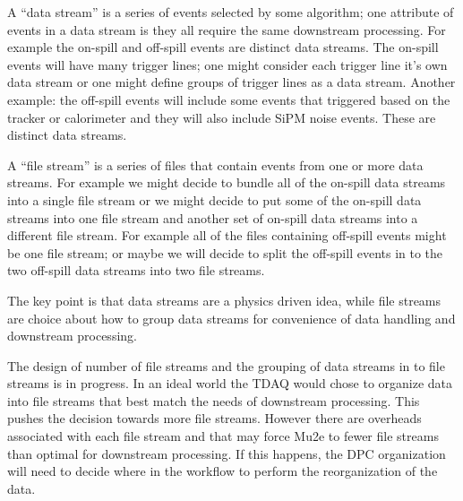 
A ``data stream'' is a series of events selected by some algorithm;
one attribute of events in a data stream is they all require the same downstream processing.
For example the on-spill and off-spill events are distinct data streams.
The on-spill events will have many trigger lines; one might consider each trigger
line it's own data stream or one might define groups of trigger lines as a data stream.
Another example: the off-spill events will include some events that triggered based on
the tracker or calorimeter and they will also include SiPM noise events.
These are distinct data streams.

A ``file stream'' is a series of files that contain events from one or more data streams.
For example we might decide to bundle all of the on-spill data streams into a single
file stream or we might decide to put some of the on-spill data streams into one file
stream and another set of on-spill data streams into a different file stream.
For example all of the files containing off-spill events might be one file stream;
or maybe we will decide to split the off-spill events in to
the two off-spill data streams into two file streams.

The key point is that data streams are a physics driven idea,
while file streams are choice about how to group data streams for convenience of data handling and downstream processing.


The design of number of file streams and the grouping of data streams in to file streams
is in progress.
In an ideal world the TDAQ would chose to organize data into file streams that best match the needs
of downstream processing.
This pushes the decision towards more file streams.
However there are overheads associated with each file stream and that may force Mu2e to fewer file streams
than optimal for downstream processing.
If this happens, the DPC organization will need to decide where in the workflow to perform
the reorganization of the data.

%
%
%

